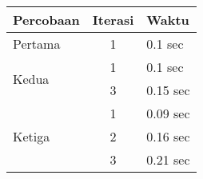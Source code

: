 \begin{table}
	\centering
	\label{tab:columnSpanning}
	\begin{tabular}{|l|c|l|} %
		\hline %
		Percobaan & Iterasi & Waktu \\
		\hline
		Pertama & 1 & 0.1 sec \\ \hline
		\multirow{2}{*}{Kedua} & 1 & 0.1 sec \\
		& 3 & 0.15 sec \\
		\hline
		\multirow{3}{*}{Ketiga} & 1 & 0.09 sec \\
		& 2 & 0.16 sec \\
		& 3 & 0.21 sec \\
		\hline
	\end{tabular}
\end{table}
